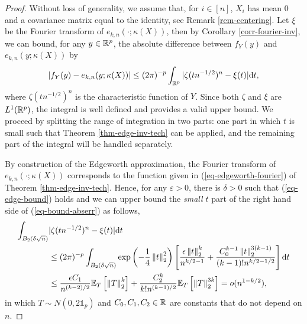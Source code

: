 \begin{proof}
    Without loss of generality, we assume that, for $i \in [n]$, $X_i$ has mean 0 and a covariance matrix equal to the identity, see Remark \ref{rem-centering}. Let $\xi$ be the Fourier transform of $e_{k, n}(\cdot; \kappa(X))$, then by Corollary \ref{corr-fourier-inv}, we can bound, for any $y \in \Rp$, the absolute difference between $f_Y(y)$ and $e_{k, n}(y; \kappa(X))$ by
    \begin{equation} \label{eq-bound-abserr}
        |f_Y(y) - e_{k, n}(y; \kappa(X))| \leq (2\pi)^{-p}\intRp{t}{|\zeta(tn^{-1/2})^n - \xi(t)|},
    \end{equation}
    where $\zeta(tn^{-1/2})^n$ is the characteristic function of $Y$. Since both $\zeta$ and $\xi$ are $L^1(\Rp)$, the integral is well defined and provides a valid upper bound. We proceed by splitting the range of integration in two parts: one part in which $t$ is small such that Theorem \ref{thm-edge-inv-tech} can be applied, and the remaining part of the integral will be handled separately.

    By construction of the Edgeworth approximation, the Fourier transform of $e_{k, n}(\cdot; \kappa(X))$ corresponds to the function given in (\ref{eq-edgeworth-fourier}) of Theorem \ref{thm-edge-inv-tech}. Hence, for any $\varepsilon > 0$, there is $\delta > 0$ such that (\ref{eq-edge-bound}) holds and we can upper bound the \textit{small $t$} part of the right hand side of (\ref{eq-bound-abserr}) as follows,
    \begin{align*}
        \int_{B_2(\delta\sqrt{n})} &|\zeta(tn^{-1/2})^n - \xi(t)| \d t\\
        &\leq (2\pi)^{-p}\int_{B_2(\delta\sqrt{n})}\expf{-\frac{1}{4}\norm{t}_2^2}\left[ \frac{\epsilon\norm{t}_2^{k}}{n^{k/2-1}} + \frac{C_0^{k-1}\norm{t}_2^{3(k-1)}}{(k-1)!n^{k/2-1/2}} \right] \d t \\
        &\leq \frac{\epsilon C_1}{n^{(k-2)/2}}\expec{T}{\norm{T}^k_2} + \frac{C_2^{k}}{k!n^{(k-1)/2}}\expec{T}{\norm{T}_2^{3k}}
        = o(n^{1-k/2}),
    \end{align*}
    in which $T \sim N(0, 2\mathbb{1}_p)$ and $C_0, C_1, C_2 \in \R$ are constants that do not depend on $n$. 


\end{proof}
